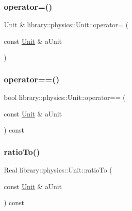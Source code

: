 \subsubsection{\texorpdfstring{operator=()}{operator=()}}
{\footnotesize\ttfamily \hyperlink{classlibrary_1_1physics_1_1_unit}{Unit} \& library\+::physics\+::\+Unit\+::operator= (\begin{DoxyParamCaption}\item[{const \hyperlink{classlibrary_1_1physics_1_1_unit}{Unit} \&}]{a\+Unit }\end{DoxyParamCaption})}

\mbox{\label{classlibrary_1_1physics_1_1_unit_a026f9b92c14aef78e7f73ac7a6baa9af}} 
\subsubsection{\texorpdfstring{operator==()}{operator==()}}
{\footnotesize\ttfamily bool library\+::physics\+::\+Unit\+::operator== (\begin{DoxyParamCaption}\item[{const \hyperlink{classlibrary_1_1physics_1_1_unit}{Unit} \&}]{a\+Unit }\end{DoxyParamCaption}) const}

\mbox{\label{classlibrary_1_1physics_1_1_unit_a23f1befd7161e4f70e5cb84bb851c347}} 
\subsubsection{\texorpdfstring{ratio\+To()}{ratioTo()}}
{\footnotesize\ttfamily Real library\+::physics\+::\+Unit\+::ratio\+To (\begin{DoxyParamCaption}\item[{const \hyperlink{classlibrary_1_1physics_1_1_unit}{Unit} \&}]{a\+Unit }\end{DoxyParamCaption}) const}

\mbox{\label{classlibrary_1_1physics_1_1_unit_a97162c115f15f4eb2221dd65f36cd128}} 
